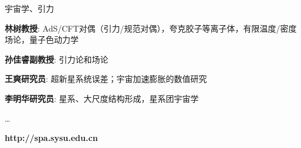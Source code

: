 \documentclass[CJK]{beamer}
\begin{document}
\begin{frame}
  \bch
  
  宇宙学、引力
  \emini
  \emini
  \ech
\end{frame}

\begin{frame}
  \bch
  \bitem
\item{{\bf 林树教授}: AdS/CFT对偶（引力/规范对偶），夸克胶子等离子体，有限温度/密度场论，量子色动力学}
\item{{\bf 孙佳睿副教授}: 引力论和场论 }
\item{{\bf 王爽研究员}: 超新星系统误差；宇宙加速膨胀的数值研究}  
\item{{\bf 李明华研究员}: 星系、大尺度结构形成，星系团宇宙学}
  \eitem
  
  \ldots
  
  \ech
\end{frame}

\begin{frame}
  \bch
  \ech
\end{frame}

\begin{frame}
\bch
\centering


{\large \bf http://spa.sysu.edu.cn}

\ech
\end{frame}
\end{document}
